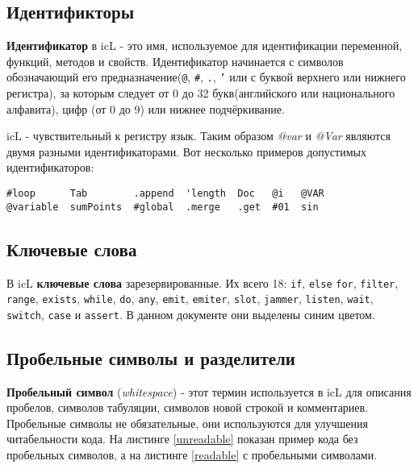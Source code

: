 \subsection{Идентификторы}

\textbf{Идентификатор} в icL - это имя, используемое для идентификации переменной, функций, методов и свойств. Идентификатор начинается с символов обозначающий его предназначение(\texttt{@}, \texttt{#}, \texttt{.}, \texttt{'} или с буквой верхнего или нижнего регистра), за которым следует от 0 до 32 букв(английского или национального алфавита), цифр (от 0 до 9) или нижнее подчёркивание.

icL - чувствительный к регистру язык. Таким образом \textit{@var} и \textit{@Var} являются двумя разными идентификаторами. Вот несколько примеров допустимых идентификаторов:

\begin{verbatim}
#loop      Tab        .append  'length  Doc   @i   @VAR
@variable  sumPoints  #global  .merge   .get  #01  sin
\end{verbatim}

\subsection{Ключевые слова}

В icL \textbf{ключевые слова} зарезервированные. Их всего 18: \texttt{if}, \texttt{else} \texttt{for}, \texttt{filter}, \texttt{range}, \texttt{exists}, \texttt{while}, \texttt{do}, \texttt{any}, \texttt{emit}, \texttt{emiter}, \texttt{slot}, \texttt{jammer}, \texttt{listen}, \texttt{wait}, \texttt{switch}, \texttt{case} и \texttt{assert}. В данном документе они выделены синим цветом.

\subsection{Пробельные символы и разделители}

\textbf{Пробельный символ} (\textit{whitespace}) - этот термин используется в icL для описания пробелов, символов табуляции, символов новой строкой и комментариев. Пробельные символы не обязательные, они используются для улучшения читабельности кода. На листинге \ref{unreadable} показан пример кода без пробельных символов, а на листинге \ref{readable} с пробельными символами.

